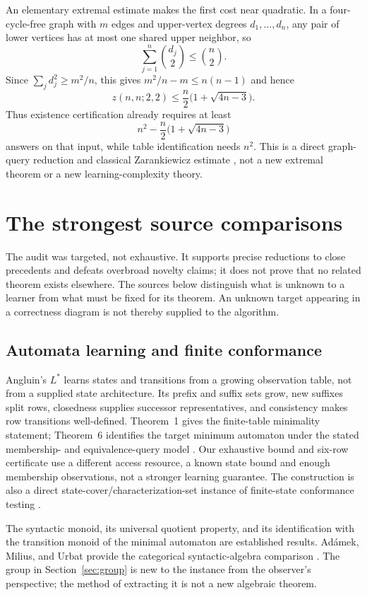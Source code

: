 \documentclass[11pt]{article}
\theoremstyle{remark}
\begin{document}
An elementary extremal estimate makes the first cost near quadratic. In a four-cycle-free graph with $m$ edges and upper-vertex degrees $d_1,\ldots,d_n$, any pair of lower vertices has at most one shared upper neighbor, so
\[
 \sum_{j=1}^n\binom{d_j}{2}\le\binom n2.
\]
Since $\sum_jd_j^2\ge m^2/n$, this gives $m^2/n-m\le n(n-1)$ and hence
\[
 z(n,n;2,2)\le\frac n2\bigl(1+\sqrt{4n-3}\bigr).
\]
Thus existence certification already requires at least
\[
 n^2-\frac n2\bigl(1+\sqrt{4n-3}\bigr)
\]
answers on that input, while table identification needs $n^2$. This is a direct graph-query reduction and classical Zarankiewicz estimate \cite{Zarankiewicz}, not a new extremal theorem or a new learning-complexity theory.

\section{The strongest source comparisons}
\label{sec:sources}

The audit was targeted, not exhaustive. It supports precise reductions to close precedents and defeats overbroad novelty claims; it does not prove that no related theorem exists elsewhere. The sources below distinguish what is unknown to a learner from what must be fixed for its theorem. An unknown target appearing in a correctness diagram is not thereby supplied to the algorithm.

\subsection{Automata learning and finite conformance}

Angluin's $L^*$ learns states and transitions from a growing observation table, not from a supplied state architecture. Its prefix and suffix sets grow, new suffixes split rows, closedness supplies successor representatives, and consistency makes row transitions well-defined. Theorem~1 gives the finite-table minimality statement; Theorem~6 identifies the target minimum automaton under the stated membership- and equivalence-query model \cite{Angluin}. Our exhaustive bound and six-row certificate use a different access resource, a known state bound and enough membership observations, not a stronger learning guarantee. The construction is also a direct state-cover/characterization-set instance of finite-state conformance testing \cite{Chow,Fujiwara}.

The syntactic monoid, its universal quotient property, and its identification with the transition monoid of the minimal automaton are established results. Ad\'amek, Milius, and Urbat provide the categorical syntactic-algebra comparison \cite{Syntactic}. The group in Section~\ref{sec:group} is new to the instance from the observer's perspective; the method of extracting it is not a new algebraic theorem.
\end{document}
